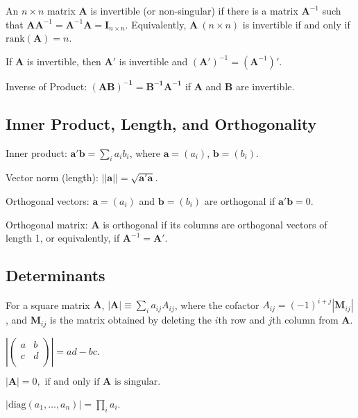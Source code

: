 \bdefi
An $n\times n$ matrix $\mathbf{A}$ is invertible (or non-singular) if
there is a matrix $\mathbf{A}^{-1}$ such that $ \mathbf{A}
\mathbf{A}^{-1} = \mathbf{A}^{-1} \mathbf{A} = \mathbf{I}_{n\times
n}.$ Equivalently, $\mathbf{A}\ (n \times n)$ is invertible if and
only if $\mathrm{rank}(\mathbf{A})=n$.
\esdefi

\btheo
If ${\mathbf A}$ is invertible, then $\mathbf{A'}$ is invertible and $(\mathbf{A'})^{-1} = (\mathbf{A}^{-1})'$.
\etheo

\btheo
Inverse of Product: $\mathbf{(AB)^{-1}=B^{-1}A^{-1}}$ if $\mathbf A$
and $\mathbf B$ are invertible.
\etheo

\newpage
\subsection{Inner Product, Length, and Orthogonality}

\bdefi
Inner product: $\mathbf{a'b}=\sum_i a_i b_i$, where
$\mathbf{a}=(a_i)$, $\mathbf{b}=(b_i)$.
\esdefi

\bsdefi
Vector norm (length): $\mathbf{||a||=\sqrt{a'a}}$.
\esdefi

\bsdefi
Orthogonal vectors: $\mathbf{a}=(a_i)$ and $\mathbf{b}=(b_i)$ are
orthogonal if $\mathbf{a'b}=0$.
\esdefi

\bsdefi
Orthogonal matrix: $\mathbf A$ is orthogonal if its columns are
orthogonal vectors of length 1, or equivalently, if
$\mathbf{A}^{-1}=\mathbf{A}'$.
\edefi


\subsection{Determinants}

\bdefi
For a square matrix $\mathbf A$, $|\mathbf{A}|\equiv \sum_i
a_{ij}A_{ij}$, where the cofactor $A_{ij}=(-1)^{i+j}|\mathbf M_{ij}|$,
and $\mathbf M_{ij}$ is the matrix obtained by deleting the $i$th row
and $j$th column from $\mathbf A$.
\esdefi

\btheo
$\left|\left(\begin{array}{cc} a & b \\ c & d \\ \end{array}
\right)\right|= ad-bc.$
\estheo

\bstheo
$ |\mathbf{A}|=0, \mbox{ if and only if } \mathbf{A} \mbox{ is
singular}.$
\estheo

\bstheo
$|\mathrm{diag}(a_1,\ldots,a_n)|=\prod_i a_i$.
\estheo

